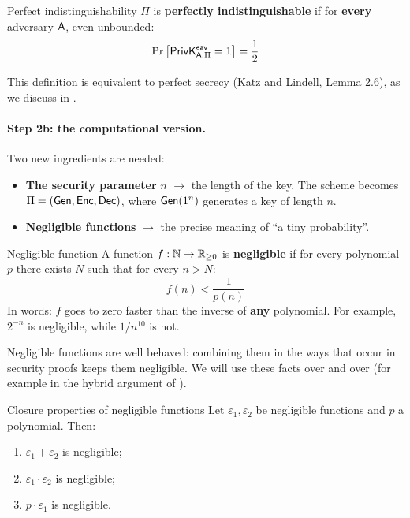 \begin{frameddefn}[label={def:perfect-indist}]{Perfect indistinguishability}
  $\Pi$ is \textbf{perfectly indistinguishable} if for \textbf{every} adversary $\mathsf{A}$, even unbounded:
  \[
    \Pr\big[\mathsf{PrivK}^{\mathsf{eav}}_{\mathsf{A},\Pi} = 1\big] = \frac{1}{2}
  \]
\end{frameddefn}

This definition is equivalent to perfect secrecy (Katz and Lindell, Lemma 2.6), as we discuss in .

\paragraph{Step 2b: the computational version.} Two new ingredients are needed:
\begin{itemize}
  \item \textbf{The security parameter} $n$ $\to$ the length of the key. The scheme becomes $\Pi = (\mathsf{Gen}, \mathsf{Enc}, \mathsf{Dec})$, where $\mathsf{Gen}(1^n)$ generates a key of length $n$.
  \item \textbf{Negligible functions} $\to$ the precise meaning of ``a tiny probability''.
\end{itemize}

\begin{frameddefn}[label={def:negl}]{Negligible function}
  A function $f : \mathbb{N} \to \mathbb{R}_{\geq 0}$ is \textbf{negligible} if for every polynomial $p$ there exists $N$ such that for every $n > N$:
  \[
    f(n) < \frac{1}{p(n)}
  \]
  In words: $f$ goes to zero faster than the inverse of \textbf{any} polynomial. For example, $2^{-n}$ is negligible, while $1/n^{10}$ is not.
\end{frameddefn}

Negligible functions are well behaved: combining them in the ways that occur in security proofs keeps them negligible. We will use these facts over and over (for example in the hybrid argument of ).

\begin{framedlem}[label={lem:negl-closure}]{Closure properties of negligible functions}
  Let $\varepsilon_1, \varepsilon_2$ be negligible functions and $p$ a polynomial. Then:
  \begin{enumerate}[label=(\roman*)]
    \item $\varepsilon_1 + \varepsilon_2$ is negligible;
    \item $\varepsilon_1 \cdot \varepsilon_2$ is negligible;
    \item $p \cdot \varepsilon_1$ is negligible.
  \end{enumerate}
\end{framedlem}


